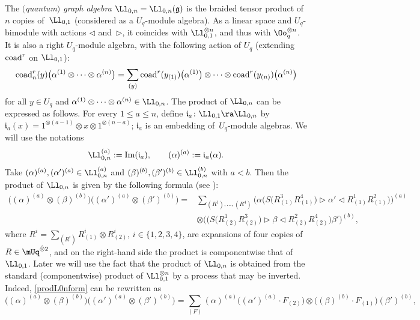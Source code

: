 The {\it $($quantum$)$ graph algebra} $\Ll_{0,n} = \Ll_{0,n}(\mathfrak{g})$ is the braided tensor product of $n$ copies of~$\Ll_{0,1}$ (considered as a $U_q$-module algebra). As a linear space and $U_q$-bimodule with actions $\lhd$ and~$\rhd$, it coincides with $\Ll_{0,1}^{\otimes n}$, and thus with $\Oo_q^{\otimes n}$. It is also a right $U_q$-module algebra, with the following action of $U_q$ (extending ${\rm coad}^r$ on $\Ll_{0,1}$):
 \begin{gather}
{\rm coad}_n^r(y)\big(\alpha^{(1)}\otimes \dots \otimes \alpha^{(n)}\big) =
\sum_{(y)} {\rm coad}^r(y_{(1)})\big(\alpha^{(1)}\big) \otimes \dots \otimes {\rm coad}^r(y_{(n)})\big(\alpha^{(n)}\big)\label{actionprod}
\end{gather}
for all $y \in U_q$ and $\alpha^{(1)}\otimes \dots \otimes \alpha^{(n)} \in \Ll_{0,n}$. The product of $\Ll_{0,n}$ can be expressed as follows. For every $1\leq a\leq n$, define $\mathfrak{i}_a\colon \Ll_{0,1}\ra \Ll_{0,n}$ by $\mathfrak{i}_a(x) = 1^{\otimes (a-1)}\otimes x \otimes 1^{\otimes (n-a)}$; $\mathfrak{i}_a$ is an embedding of~$U_q$-module algebras. We will use the notations
\begin{equation}\label{plgtL01a}
\Ll_{0,n}^{(a)}:= {\rm Im}(\mathfrak{i}_a),\qquad (\alpha)^{(a)} := \mathfrak{i}_a(\alpha).
\end{equation}
Take $(\alpha)^{(a)},(\alpha')^{(a)} \in \Ll_{0,n}^{(a)}$ and $(\beta)^{(b)},(\beta')^{(b)} \in \Ll_{0,n}^{(b)}$ with $a<b$. Then the product of $\Ll_{0,n}$ is given by the following formula (see \cite[Section 6]{BR}):
\begin{align}
\big((\alpha)^{(a)}\otimes (\beta)^{(b)}\big) \big((\alpha')^{(a)} \otimes (\beta')^{(b)}\big) ={}& \sum_{(R^1),\dots, (R^4)} \big(\alpha \big(S\big(R^3_{(1)}R^4_{(1)}\big)\rhd \alpha' \lhd R^1_{(1)}R^2_{(1)}\big)\big)^{(a)}\nonumber\\
 &
\otimes \big( \big( S\big(R^1_{(2)}R^3_{(2)}\big) \rhd \beta \lhd R^2_{(2)}R^4_{(2)}\big)\beta'\big)^{(b)},\label{prodL0nform}
\end{align}
where $R^i = \sum_{(R^i)}R_{(1)}^i\otimes R_{(2)}^i$, $i\in \{1,2,3,4\}$, are expansions of four copies of $R\in \mUq^{\hat \otimes 2}$, and on the right-hand side the product is componentwise that of $\Ll_{0,1}$. Later we will use the fact that the product of $\Ll_{0,n}$ is obtained from the standard (componentwise) product of $\Ll_{0,1}^{\otimes n}$ by a process that may be inverted. Indeed, \eqref{prodL0nform} can be rewritten as
\begin{equation}\label{prodL0nform2}
\big((\alpha)^{(a)}\otimes (\beta)^{(b)}\big) \big((\alpha')^{(a)} \otimes (\beta')^{(b)}\big) = \sum_{(F)} (\alpha)^{(a)}\big((\alpha')^{(a)}\cdot F_{(2)}\big)\otimes \big((\beta)^{(b)}\cdot F_{(1)}\big)(\beta')^{(b)},
\end{equation}
